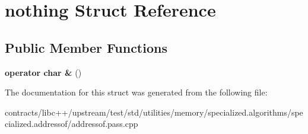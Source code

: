 \hypertarget{structnothing}{}\section{nothing Struct Reference}
\label{structnothing}
\subsection*{Public Member Functions}
\begin{DoxyCompactItemize}
\item 
\mbox{\label{structnothing_a0d46f831c4624c0cceb8dc047b970b78}} 
{\bfseries operator char \&} ()
\end{DoxyCompactItemize}


The documentation for this struct was generated from the following file\+:\begin{DoxyCompactItemize}
\item 
contracts/libc++/upstream/test/std/utilities/memory/specialized.\+algorithms/specialized.\+addressof/addressof.\+pass.\+cpp\end{DoxyCompactItemize}
